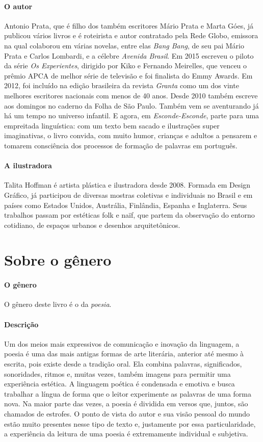 \documentclass[11pt]{extarticle}
\begin{document}
\paragraph{O autor} Antonio Prata, que é  filho dos também escritores Mário Prata e Marta Góes, já publicou vários livros e é roteirista e autor contratado pela Rede Globo, emissora na qual colaborou em várias novelas, entre elas \textit{Bang Bang}, de seu pai Mário Prata e Carlos Lombardi, e a célebre \textit{Avenida Brasil}. Em 2015 escreveu o piloto da série \textit{Os Experientes}, dirigido por Kiko e Fernando Meirelles, que venceu o prêmio APCA de melhor série de televisão e foi finalista do Emmy Awards. Em 2012, foi incluído na edição brasileira da revista \textit{Granta} como um dos vinte melhores escritores nacionais com menos de 40 anos. Desde 2010 também escreve aos domingos no caderno da Folha de São Paulo. Também vem se aventurando já há um tempo no universo infantil. E agora, em \textit{Esconde-Esconde}, parte para uma empreitada linguística: com um texto bem sacado e ilustrações super imaginativas, o livro convida, com muito humor, crianças e adultos a pensarem e tomarem consciência dos processos de formação de palavras em português.

\paragraph{A ilustradora} Talita Hoffman é artista plástica e ilustradora desde 2008. Formada em
Design Gráfico, já participou de diversas mostras
coletivas e individuais no Brasil e em países como Estados Unidos,
Austrália, Finlândia, Espanha e Inglaterra. Seus trabalhos passam por
estéticas folk e naïf, que partem da observação do entorno cotidiano, de
espaços urbanos e desenhos arquitetônicos.

\section{Sobre o gênero}

\paragraph{O gênero} O gênero deste livro é o da \textit{poesia}. 

\paragraph{Descrição} Um dos meios mais expressivos de comunicação e inovação da linguagem, a poesia é uma das mais antigas formas de arte literária, anterior até mesmo à escrita, pois existe desde a tradição oral. Ela combina palavras, significados, sonoridades, ritmos e, muitas vezes, também imagens para permitir uma experiência estética. A linguagem poética é condensada e emotiva e busca trabalhar a língua de forma que o leitor experimente as palavras de uma forma nova. Na maior parte das vezes, a poesia é dividida em versos que, juntos, são chamados de estrofes. O ponto de vista do autor e sua visão pessoal do mundo estão muito presentes nesse tipo de texto e, justamente por essa particularidade, a experiência da leitura de uma poesia é extremamente individual e subjetiva.
\end{document}
